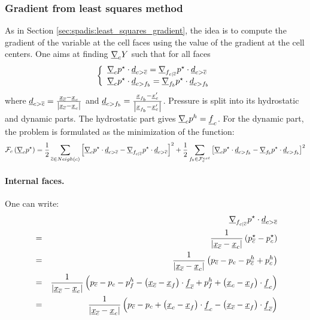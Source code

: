 \subsubsection{Gradient from least squares method}

As in Section \ref{sec:spadis:least_squares_gradient}, the idea is to compute
the gradient of the variable at the cell faces using the value of the gradient
at the cell centers. One aims at finding $\underline{\nabla}_{c}{ Y}$ such
that for all faces
\begin{equation}
	\left\{\begin{array}{l}
		\underline{\nabla}_{c}{p^{\star}}\cdot\underline{d}_{{c > {\overline{c}}}}=\underline{\nabla}_{{{f}_{c|{\overline{c}}}}}{p^{\star}}\cdot\underline{d}_{{c > {\overline{c}}}} \\
		\underline{\nabla}_{c}{p^{\star}}\cdot\underline{d}_{{c>{{f}_{b}}}}=\underline{\nabla}_{{{f}_{b}}}{p^{\star}}\cdot\underline{d}_{{c>{{f}_{b}}}}
	\end{array}\right.
\end{equation}
where $\underline{d}_{{c > {\overline{c}}}}=\frac{\underline{x}_{{\overline{c}}}-{\underline{x}_{c}}}{\left| \underline{x}_{{\overline{c}}}-{\underline{x}_{c}} \right|}$ and
$\underline{d}_{{c>{{f}_{b}}}}=\frac{\underline{x}_{{{f}_{b}}}-\underline{x}_{c}^\prime}{\left| \underline{x}_{{{f}_{b}}}-\underline{x}_{c}^\prime \right|}$.
Pressure is split into its hydrostatic and dynamic parts. The hydrostatic part
gives $\underline{\nabla}_{c}{p^h}=\underline{f}_{c}$. For the dynamic part, the problem
is formulated as the minimization of the function:
\begin{equation}
	\mathcal{F}_{c}\left(\underline{\nabla}_{c}{p^{\star}}\right)=\frac{1}{2}\sum_{{\overline{c}} \in Neigh\left(c\right)}\left[\underline{\nabla}_{c}{p^\star}\cdot\underline{d}_{{c > {\overline{c}}}}-\underline{\nabla}_{{{f}_{c|{\overline{c}}}}}{p^\star}\cdot\underline{d}_{{c > {\overline{c}}}}\right]^2+\frac{1}{2}\sum_{{{f}_{b}} \in \mathcal{F}^{ext}_{c}}\left[\underline{\nabla}_{c}{p^\star}\cdot\underline{d}_{{c>{{f}_{b}}}}-\underline{\nabla}_{{{f}_{b}}}{p^\star}\cdot\underline{d}_{{c>{{f}_{b}}}}\right]^2
\end{equation}

\paragraph{Internal faces.} One can write:
\begin{align*}
	&&\underline{\nabla}_{{{f}_{c|{\overline{c}}}}}{p^\star}\cdot\underline{d}_{{c > {\overline{c}}}} \\
	&=&\frac{1}{\left| \underline{x}_{{\overline{c}}}-{\underline{x}_{c}} \right|}\left(p_{{\overline{c}}}^\star-p_{c}^\star\right) \\
	&=&\frac{1}{\left| \underline{x}_{{\overline{c}}}-{\underline{x}_{c}} \right|}\left(p_{{\overline{c}}}-p_{c}-p_{{\overline{c}}}^{h}+p_{c}^{h}\right) \\
	&=&\frac{1}{\left| \underline{x}_{{\overline{c}}}-{\underline{x}_{c}} \right|}\left(p_{{\overline{c}}}-p_{c}-p_{{f}}^{h}-\left(\underline{x}_{{\overline{c}}}-\underline{x}_{{f}}\right)\cdot\underline{f}_{{\overline{c}}}+p_{{f}}^{h}+\left({\underline{x}_{c}}-\underline{x}_{{f}}\right)\cdot\underline{f}_{c}\right) \\
	&=&\frac{1}{\left| \underline{x}_{{\overline{c}}}-{\underline{x}_{c}} \right|}\left(p_{{\overline{c}}}-p_{c}+\left({\underline{x}_{c}}-\underline{x}_{{f}}\right)\cdot\underline{f}_{c}-\left(\underline{x}_{{\overline{c}}}-\underline{x}_{{f}}\right)\cdot\underline{f}_{{\overline{c}}}\right)
\end{align*}


